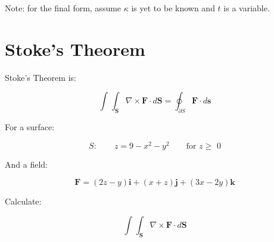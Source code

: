 \documentclass{article}
\begin{document}
\vspace{1cm}
Note: for the final form, assume $\kappa$ is yet to be known and $t$ is a variable.

\clearpage
\section{Stoke's Theorem}

Stoke's Theorem is: 

\begin{equation}
  \int^{}_{} \int^{}_{\mathbf{S}} \nabla \times \mathbf{F} \cdot d\mathbf{S} = 
  \oint_{\partial S} \mathbf{F} \cdot d\mathbf{s}
\end{equation}

For a surface:

\begin{equation}
  S: \qquad z = 9 -x^{2} - y^{2} \qquad \text{for $z \geq$ 0}
\end{equation}

And a field:

\begin{equation}
  \mathbf{F} = \left( 2z - y \right) \mathbf{i}  +
  \left( x + z \right) \mathbf{j} + 
  \left( 3x - 2y \right) \mathbf{k}
\end{equation}

Calculate:

\begin{equation}
  \int^{}_{} \int^{}_{\mathbf{S}} \nabla \times \mathbf{F} \cdot d\mathbf{S}
\end{equation}
\end{document}
